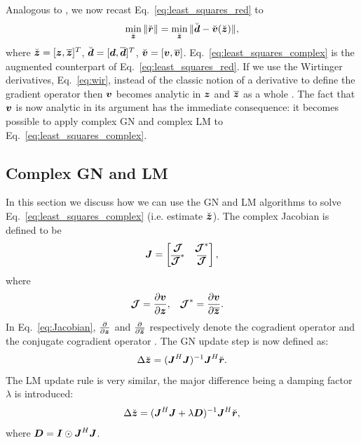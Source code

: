 \documentclass[useAMS,usenatbib]{mn2e}
\newcommand{\bz}{\bmath{z}}
\newcommand{\br}{\bmath{r}}
\newcommand{\bd}{\bmath{d}}
\newcommand{\bv}{\bmath{v}}
\newcommand{\bJ}{\bmath{J}}
\newcommand{\bD}{\bmath{D}}
\newcommand{\bI}{\bmath{I}}
\newcommand{\bmJ}{\bmath{\mathcal{J}}}
\newcommand{\conj}[1]{\overline{#1}}
\begin{document}
Analogous to \cite{Smirnov2015}, we now recast Eq.~\eqref{eq:least_squares_red} to 
\begin{equation}
\label{eq:least_squares_complex}
\min_{\breve{\bz}} \|\breve{\br}\| = \min_{\breve{\bz}} \|\breve{\bd} - \breve{\bv}(\breve{\bz})\|, 
\end{equation}
where $\breve{\bz} = [\bz,\conj{\bz}]^T$, $\breve{\bd} = [\bd,\conj{\bd}]^T$, $\breve{\bv} = [\bv,\conj{\bv}]$. Eq.~\eqref{eq:least_squares_complex} is the augmented counterpart of Eq.~\eqref{eq:least_squares_red}.
If we use the Wirtinger derivatives, Eq.~\eqref{eq:wir}, instead of the classic notion of a derivative to define the gradient operator then 
$\bv$ becomes analytic in $\bz$ and $\conj{\bz}$ as a whole \citep{Smirnov2015}. The fact that $\bv$ is now analytic in its argument has the immediate consequence: it becomes possible to apply complex GN
and complex LM to Eq.~\eqref{eq:least_squares_complex}. 

\subsection{Complex GN and LM}
In this section we discuss how we can use the GN and LM algorithms to solve Eq.~\eqref{eq:least_squares_complex} (i.e. estimate $\breve{\bz}$). The complex Jacobian is defined to be
\begin{equation}
\label{eq:Jacobian}
\bJ = \begin{bmatrix}
       \bmJ & \bmJ^*\\
       \conj{\bmJ}^* & \conj{\bmJ} 
      \end{bmatrix},
\end{equation}
where 
\begin{align}
\bmJ &= \frac{\partial \bv}{\partial \bz}, & \bmJ^* &= \frac{\partial \bv}{\partial \conj{\bz}}. 
\end{align}
In Eq.~\eqref{eq:Jacobian}, $\frac{\partial}{\partial \bz}$ and $\frac{\partial}{\partial \conj{\bz}}$ respectively denote the cogradient operator and the conjugate cogradient operator \citep{Sorber2012}.
The GN update step is now defined as:
\begin{equation}
\label{eq:GN_update}
 \Delta \breve{\bz} = (\bJ^H\bJ)^{-1}\bJ^H\breve{\br}.
\end{equation}
The LM update rule is very similar, the major difference being a damping factor $\lambda$ is introduced:
\begin{equation}
\label{eq:LM_update}
\Delta \breve{\bz} = (\bJ^H\bJ + \lambda\bD)^{-1}\bJ^H\breve{\br},
\end{equation}
where $\bD=\bI\odot\bJ^H\bJ$. 
\end{document}
